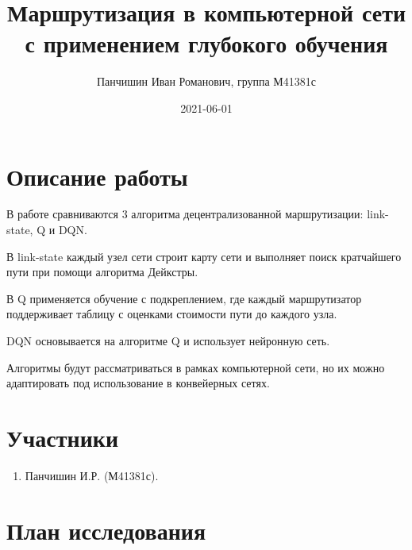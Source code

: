 \documentclass[a4paper]{article}
\title{Маршрутизация в компьютерной сети с применением глубокого обучения}
\author{Панчишин Иван Романович, группа М41381с}
\date{2021-06-01}
\begin{document}
\maketitle

\section{Описание работы}

В работе сравниваются 3 алгоритма децентрализованной маршрутизации:
link-state, Q и DQN.

В link-state каждый узел сети строит карту сети и выполняет поиск кратчайшего
пути при помощи алгоритма Дейкстры.

В Q применяется обучение с подкреплением, где каждый маршрутизатор поддерживает
таблицу с оценками стоимости пути до каждого узла.

DQN основывается на алгоритме Q и использует нейронную сеть.

Алгоритмы будут рассматриваться в рамках компьютерной сети, но их можно
адаптировать под использование в конвейерных сетях.

\section{Участники}

\begin{enumerate}
    \item Панчишин И.Р. (М41381с).
\end{enumerate}

\section{План исследования}
\end{document}
